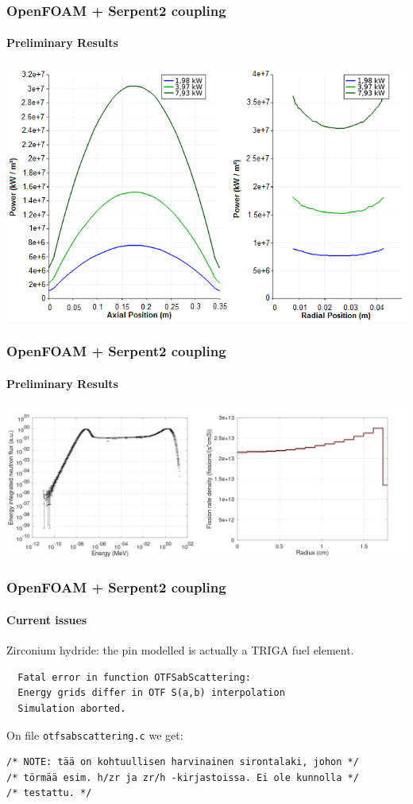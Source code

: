\documentclass[svgnames,smaller,table]{beamer}
\begin{document}
\begin{frame}
  \frametitle{OpenFOAM + Serpent2 coupling}
  \framesubtitle{Preliminary Results}
  \begin{center}
    \includegraphics[scale=0.55]{figuras/power.png}
    
  \end{center}
\end{frame}

\begin{frame}
  \frametitle{OpenFOAM + Serpent2 coupling}
  \framesubtitle{Preliminary Results}
  \begin{center}
    \includegraphics[scale=0.14]{figuras/reactionrate.png}
    
  \end{center}
\end{frame}

\begin{frame}[fragile] %
  \frametitle{OpenFOAM + Serpent2 coupling}
  \framesubtitle{Current issues}
  \begin{center}
  Zirconium hydride: the pin modelled is actually a TRIGA fuel element.\\
\begin{verbatim}
  Fatal error in function OTFSabScattering:
  Energy grids differ in OTF S(a,b) interpolation
  Simulation aborted.
\end{verbatim}

On file \texttt{otfsabscattering.c} we get:

\begin{verbatim}
/* NOTE: tää on kohtuullisen harvinainen sirontalaki, johon */
/* törmää esim. h/zr ja zr/h -kirjastoissa. Ei ole kunnolla */
/* testattu. */
\end{verbatim}
  
  \end{center}
\end{frame}
\end{document}
